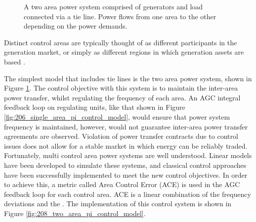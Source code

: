 \begin{figure}[ht]
	\centering
	\resizebox{12cm}{!}{}
	\caption[Overview of two area power system with tie line]{A two area power system comprised of generators and load connected via a tie line. Power flows from one area to the other depending on the power demands.}
	\label{fig:207_two_area_system}
\end{figure}

Distinct control areas are typically thought of as different participants in the generation market, or simply as different regions in which generation assets are based \cite{Kothari2011}.

The simplest model that includes tie lines is the two area power system, shown in Figure \ref{fig:207_two_area_system}. The control objective with this system is to maintain the inter-area power transfer, whilst regulating the frequency of each area. An AGC integral feedback loop on regulating units, like that shown in Figure \ref{fig:206_single_area_pi_control_model}, would ensure that power system frequency is maintained, however, would not guarantee inter-area power transfer agreements are observed. Violation of power transfer contracts due to control issues does not allow for a stable market in which energy can be reliably traded. Fortunately, multi control area power systems are well understood. Linear models have been developed to simulate these systems, and classical control approaches have been successfully implemented to meet the new control objectives. In order to achieve this, a metric called Area Control Error (ACE) is used in the AGC feedback loop for each control area. ACE is a linear combination of the frequency deviations and the . The implementation of this control system is shown in Figure \ref{fig:208_two_area_pi_control_model}.

\clearpage

\begin{sidewaysfigure}[ht]
\centering
\resizebox{22cm}{!}{}
\caption[Two area power system with PI feedback control]{A classical feedback control approach to a two area power system \cite{Kundur1994}.}
\label{fig:208_two_area_pi_control_model}
\end{sidewaysfigure}

\clearpage